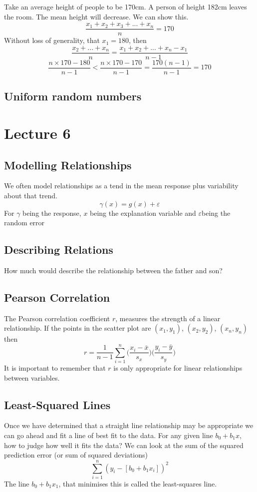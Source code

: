 \documentclass{report}
\theoremstyle{definition}
\theoremstyle{plain}
\theoremstyle{remark}
\begin{document}
Take an average height of people to be 170cm. A person of height 182cm leaves the room. The mean height will decrease. We can show this.
$$ \frac{x_1 + x_2 + x_3 + ... + x_n}{n} = 170 $$ Without loss of generality, that $ x_1 = 180 $, then $$ \frac{x_2 + ... + x_n}{n} = \frac{x_1 + x_2 + ... + x_n - x_1}{n-1}$$
$$ \frac{n \times 170 - 180}{n-1} < \frac{n \times 170 - 170}{n-1} = \frac{170(n-1)}{n-1} = 170 $$
\subsection{Uniform random numbers}

\section{Lecture 6}
\subsection{Modelling Relationships}
We often model relationships as a tend in the mean response plus variability about that trend.
$$ \gamma (x) = g(x) + \varepsilon $$
For $ \gamma $ being the response, $ x $ being the explanation variable and $ \varepsilon  $being the random error
\subsection{Describing Relations}
How much would describe the relationship between the father and son?

\subsection{Pearson Correlation}
The Pearson correlation coefficient $ r $, measures the strength of a linear relationship. If the points in the scatter plot are $ (x_1, y_1) $, $ (x_2, y_2) $, $ (x_n, y_n) $ then
$$ r = \frac{1}{n-1} \sum_{i=1}^n \Big ( \frac{x_i - \bar{x}}{s_x}\Big) \Big ( \frac{y_i - \bar{y}}{s_y}\Big) $$
It  is important to remember that $ r $ is only appropriate for linear relationships between variables.
\subsection{Least-Squared Lines}
Once we have determined that a straight line relationship may be appropriate we can go ahead and fit a line of best fit to the data. For any given line $ b_0 + b_1x $, how to judge how well it fits the data? We can look at the sum of the squared prediction error (or sum of squared deviations) 
$$ \sum_{i=1}^n (y_i - [b_0 + b_1x_i])^2 $$ 
The line $ b_0 + b_1 x_1 $, that minimises this is called the least-squares line.
\end{document}
